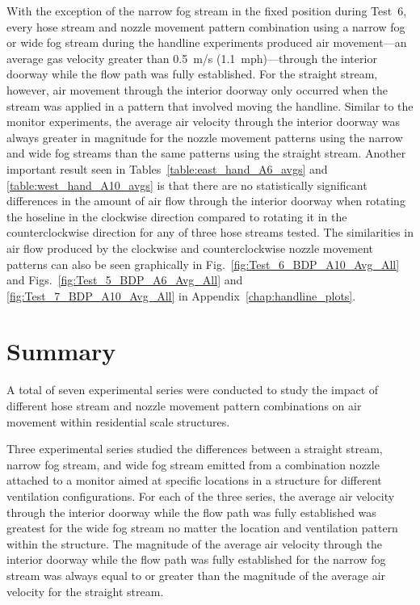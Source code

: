 \documentclass[12pt,oneside]{book}
\begin{document}
With the exception of the narrow fog stream in the fixed position during Test~6, every hose stream and nozzle movement pattern combination using a narrow fog or wide fog stream during the handline experiments produced air movement---an average gas velocity greater than 0.5~m/s (1.1~mph)---through the interior doorway while the flow path was fully established. For the straight stream, however, air movement through the interior doorway only occurred when the stream was applied in a pattern that involved moving the handline. Similar to the monitor experiments, the average air velocity through the interior doorway was always greater in magnitude for the nozzle movement patterns using the narrow and wide fog streams than the same patterns using the straight stream. Another important result seen in Tables~\ref{table:east_hand_A6_avgs} and \ref{table:west_hand_A10_avgs} is that there are no statistically significant differences in the amount of air flow through the interior doorway when rotating the hoseline in the clockwise direction compared to rotating it in the counterclockwise direction for any of three hose streams tested. The similarities in air flow produced by the clockwise and counterclockwise nozzle movement patterns can also be seen graphically in Fig.~\ref{fig:Test_6_BDP_A10_Avg_All} and Figs.~\ref{fig:Test_5_BDP_A6_Avg_All} and \ref{fig:Test_7_BDP_A10_Avg_All} in Appendix~\ref{chap:handline_plots}. 


\chapter{Summary}
\label{chap:summary}

A total of seven experimental series were conducted to study the impact of different hose stream and nozzle movement pattern combinations on air movement within residential scale structures. 

Three experimental series studied the differences between a straight stream, narrow fog stream, and wide fog stream emitted from a combination nozzle attached to a monitor aimed at specific locations in a structure for different ventilation configurations. For each of the three series, the average air velocity through the interior doorway while the flow path was fully established was greatest for the wide fog stream no matter the location and ventilation pattern within the structure. The magnitude of the average air velocity through the interior doorway while the flow path was fully established for the narrow fog stream was always equal to or greater than the magnitude of the average air velocity for the straight stream. 
\end{document}
